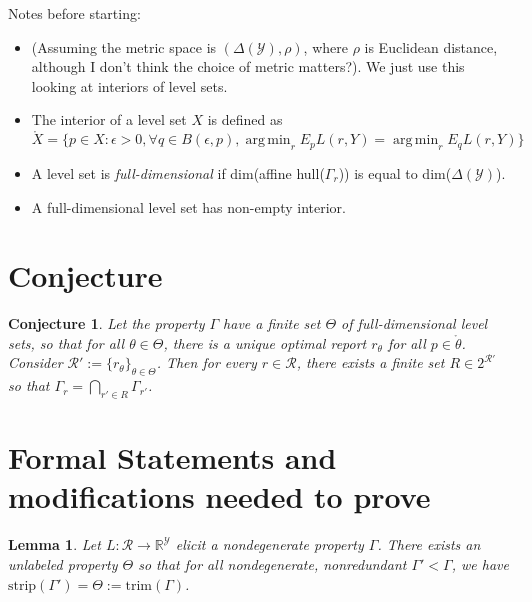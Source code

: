 \documentclass[12pt]{article}
\newcommand{\Comments}{1}
\newcommand{\mynote}[2]{\ifnum\Comments=1\textcolor{#1}{#2}\fi}
\newcommand{\jessie}[1]{\mynote{purple}{[JF: #1]}}
\newcommand{\reals}{\mathbb{R}}
\newcommand{\R}{\mathcal{R}}
\newcommand{\Y}{\mathcal{Y}}
\newcommand{\inter}[1]{\mathring{#1}}%
\newcommand{\strip}{\text{strip}}
\DeclareMathOperator*{\argmin}{arg\,min}
\newtheorem{lemma}{Lemma}
\newtheorem{definition}{Definition}
\newtheorem{conjecture}{Conjecture}
\begin{document}


Notes before starting:
\begin{itemize}
\item (Assuming the metric space is $(\Delta(\Y), \rho)$, where $\rho$ is Euclidean distance, although I don't think the choice of metric matters?).
We just use this looking at interiors of level sets.
\item The interior of a level set $X$ is defined as $\inter{X} = \{p \in X: \epsilon > 0,  \forall q \in B(\epsilon,p), \argmin_rE_p L(r,Y) = \argmin_r E_q L(r,Y)\}$
\item A level set is \emph{full-dimensional} if dim(affine hull($\Gamma_r$)) is equal to dim($\Delta(\Y)$). 
\item A full-dimensional level set has non-empty interior.
\end{itemize}

\section{Conjecture}


\begin{conjecture}\label{conj:intersect-lev-sets}
  Let the property $\Gamma$ have a finite set $\Theta$ of full-dimensional level sets, so that for all $\theta \in \Theta$,  there is a unique optimal report $r_\theta$ for all $p \in \inter{\theta}$.
  Consider $\R' := \{ r_\theta\}_{\theta \in \Theta}$.
  Then for every $r \in \R$, there exists a finite set $R \in 2^{\R'}$ so that $\Gamma_r = \bigcap_{r' \in R} \Gamma_{r'}$.
\end{conjecture}


\section{Formal Statements and modifications needed to prove}


\begin{lemma}
  Let $L: \R \to \reals^\Y$ elicit a nondegenerate property $\Gamma$.
There exists an unlabeled property $\Theta$ so that for all nondegenerate, nonredundant $\Gamma' < \Gamma$, we have $\strip(\Gamma') = \Theta := \text{trim}(\Gamma)$.
\end{lemma}
\end{document}
